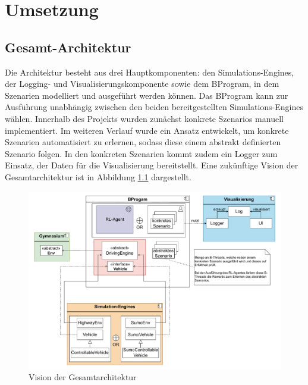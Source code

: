 \chapter{Umsetzung}

\section{Gesamt-Architektur}
Die Architektur besteht aus drei Hauptkomponenten: den Simulations-Engines, der Logging- und Visualisierungskomponente sowie dem BProgram, in dem Szenarien modelliert und ausgeführt werden können. Das BProgram kann zur Ausführung unabhängig zwischen den beiden bereitgestellten Simulations-Engines wählen. Innerhalb des Projekts wurden zunächst konkrete Szenarios manuell implementiert. Im weiteren Verlauf wurde ein Ansatz entwickelt, um konkrete Szenarien automatisiert zu erlernen, sodass diese einem abstrakt definierten Szenario folgen. In den konkreten Szenarien kommt zudem ein Logger zum Einsatz, der Daten für die Visualisierung bereitstellt. Eine zukünftige Vision der Gesamtarchitektur ist in Abbildung \ref{fig:architecture} dargestellt.

\begin{figure}[h]
    \centering
    \includegraphics[width=1\linewidth]{contents/figures/fullArchitectureVision.pdf}
    \caption{Vision der Gesamtarchitektur}
    \label{fig:architecture}
\end{figure}

